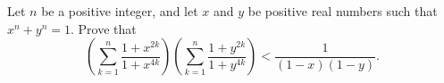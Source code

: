 Let $n$ be a positive integer, and let $x$ and $y$ be positive real numbers such that $x^{n}+y^{n}=1$. Prove that
\[
\left( \sum_{k=1}^{n} \frac{1+x^{2k}}{1+x^{4k}} \right) \left( \sum_{k=1}^{n} \frac{1+y^{2k}}{1+y^{4k}} \right) < \frac{1}{(1-x)(1-y)}.
\]
